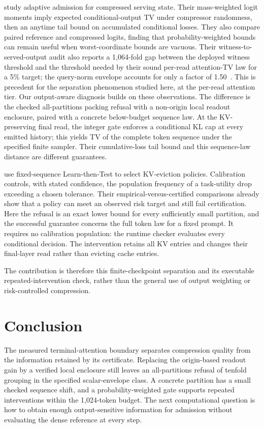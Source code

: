 \documentclass[10pt]{article}
\theoremstyle{definition}\newtheorem{definition}[theorem]{Definition}
\begin{document}
\citet{pricingrisk} study adaptive admission for compressed serving state. Their mass-weighted logit moments imply expected conditional-output TV under compressor randomness, then an anytime tail bound on accumulated conditional losses. They also compare paired reference and compressed logits, finding that probability-weighted bounds can remain useful when worst-coordinate bounds are vacuous. Their witness-to-served-output audit also reports a 1,064-fold gap between the deployed witness threshold and the threshold needed by their sound per-read attention-TV law for a 5\% target; the query-norm envelope accounts for only a factor of 1.50~\citep[Section~7]{pricingrisk}. This is precedent for the separation phenomenon studied here, at the per-read attention tier. Our output-aware diagnosis builds on these observations. The difference is the checked all-partitions packing refusal with a non-origin local readout enclosure, paired with a concrete below-budget sequence law. At the KV-preserving final read, the integer gate enforces a conditional KL cap at every emitted history; this yields TV of the complete token sequence under the specified finite sampler. Their cumulative-loss tail bound and this sequence-law distance are different guarantees.

\citet{riskkv} use fixed-sequence Learn-then-Test to select KV-eviction policies. Calibration controls, with stated confidence, the population frequency of a task-utility drop exceeding a chosen tolerance. Their empirical-versus-certified comparisons already show that a policy can meet an observed risk target and still fail certification. Here the refusal is an exact lower bound for every sufficiently small partition, and the successful guarantee concerns the full token law for a fixed prompt. It requires no calibration population: the runtime checker evaluates every conditional decision. The intervention retains all KV entries and changes their final-layer read rather than evicting cache entries.

The contribution is therefore this finite-checkpoint separation and its executable repeated-intervention check, rather than the general use of output weighting or risk-controlled compression.

\section{Conclusion}
The measured terminal-attention boundary separates compression quality from the information retained by its certificate. Replacing the origin-based readout gain by a verified local enclosure still leaves an all-partitions refusal of tenfold grouping in the specified scalar-envelope class. A concrete partition has a small checked sequence shift, and a probability-weighted gate supports repeated interventions within the 1,024-token budget. The next computational question is how to obtain enough output-sensitive information for admission without evaluating the dense reference at every step.
\end{document}
